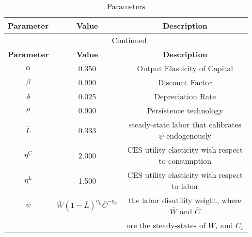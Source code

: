 \documentclass{article}
\begin{document}
\begin{center}
\begin{longtable}{ccc}
\caption{Parameters}\label{tbl:RBC.Parameters}\\%
\toprule%
\multicolumn{1}{c}{\textbf{Parameter}} &
\multicolumn{1}{c}{\textbf{Value}} &
\multicolumn{1}{c}{\textbf{Description}}\\%
\midrule%
\endfirsthead%
\multicolumn{3}{c}{{\tablename} \thetable{} {--} Continued}\\%
\midrule%
\multicolumn{1}{c}{\textbf{Parameter}} &
\multicolumn{1}{c}{\textbf{Value}} &
\multicolumn{1}{c}{\textbf{Description}}\\%
\midrule%
\endhead%
\({\alpha}\) 	 & 	 0.350 	 & 	 Output Elasticity of Capital\\
\({\beta}\) 	 & 	 0.990 	 & 	 Discount Factor\\
\({\delta}\) 	 & 	 0.025 	 & 	 Depreciation Rate\\
\({\rho}\) 	   & 	 0.900 	 & 	 Persistence technology\\
\({\bar{L}}\)  & 	 0.333 	 & 	 steady-state labor that calibrates \(\psi \) endogenously\\
\({\eta^C}\) 	 & 	 2.000 	 & 	 CES utility elasticity with respect to consumption\\
\({\eta^L}\) 	 & 	 1.500 	 & 	 CES utility elasticity with respect to labor\\
\({\psi}\) 	   & 	 \(\bar{W}{(1-\bar{L})}^{\eta_L} \bar{C}^{-\eta_C}\) 	 & 	the labor disutility weight, where \(\bar{W}\) and \(\bar{C}\) \\
               &           &are the steady-states of \(W_t\) and \(C_t\)
\\
\bottomrule%
\end{longtable}
\end{center}

  
\end{document}
